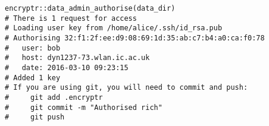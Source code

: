 \documentclass[class=minimal,border=0]{standalone}
\begin{document}
%
\begin{BVerbatim}[bgcolor=b-darkgrey]
encryptr::data_admin_authorise(data_dir)
# There is 1 request for access
# Loading user key from /home/alice/.ssh/id_rsa.pub
# Authorising 32:f1:2f:ee:d9:08:69:1d:35:ab:c7:b4:a0:ca:f0:78
#   user: bob
#   host: dyn1237-73.wlan.ic.ac.uk
#   date: 2016-03-10 09:23:15
# Added 1 key
# If you are using git, you will need to commit and push:
#     git add .encryptr
#     git commit -m "Authorised rich"
#     git push
\end{BVerbatim}
\end{document}
